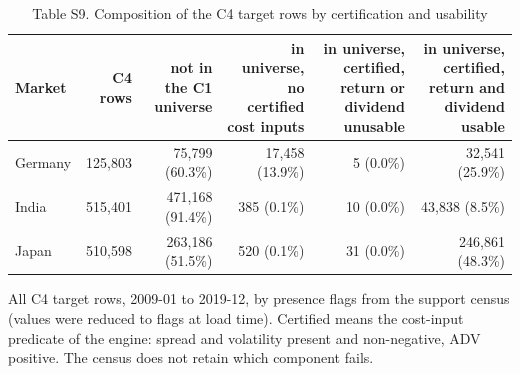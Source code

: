 \begin{table}[t]
\centering
\small
\caption{Table S9. Composition of the C4 target rows by certification and usability}
\label{tab:s9}
\begin{tabular}{lrrrrr}
\toprule
Market & C4 rows & not in the C1 universe & in universe, no certified cost inputs & in universe, certified, return or dividend unusable & in universe, certified, return and dividend usable \\
\midrule
Germany & 125,803 & 75,799 (60.3\%) & 17,458 (13.9\%) & 5 (0.0\%) & 32,541 (25.9\%) \\
India & 515,401 & 471,168 (91.4\%) & 385 (0.1\%) & 10 (0.0\%) & 43,838 (8.5\%) \\
Japan & 510,598 & 263,186 (51.5\%) & 520 (0.1\%) & 31 (0.0\%) & 246,861 (48.3\%) \\
\bottomrule
\end{tabular}
\par\vspace{2pt}
\parbox{\textwidth}{\footnotesize All C4 target rows, 2009-01 to 2019-12, by presence flags from the support census (values were reduced to flags at load time). Certified means the cost-input predicate of the engine: spread and volatility present and non-negative, ADV positive. The census does not retain which component fails.}
\end{table}
